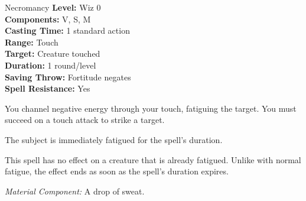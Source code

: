 {Necromancy}
{
	\textbf{Level:}
	Wiz 0\\
	\textbf{Components:}
	V, S, M\\
	\textbf{Casting Time:}
	1 standard action\\
	\textbf{Range:}
	Touch\\
	\textbf{Target:}
	Creature touched\\
	\textbf{Duration:}
	1 round/level\\
	\textbf{Saving Throw:}
	Fortitude negates\\
	\textbf{Spell Resistance:}
	Yes\\
}
{
	You channel negative energy through your touch, fatiguing the target. You must succeed on a touch attack to strike a target.

	The subject is immediately fatigued for the spell's duration.

	This spell has no effect on a creature that is already fatigued. Unlike with normal fatigue, the effect ends as soon as the spell's duration expires.

	\textit{Material Component:}
	A drop of sweat.

}
